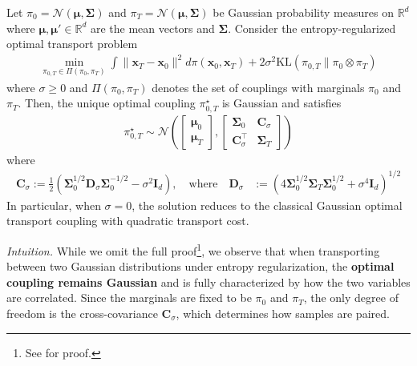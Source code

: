 \documentclass{article}
\begin{document}
\begin{lemma}\label{lemma:static-entropy-gaussian-ot}
Let $\pi_0 =\mathcal{N}(\boldsymbol{\mu}, \boldsymbol{\Sigma})$ and $\pi_T = \mathcal{N}(\boldsymbol{\mu}, \boldsymbol{\Sigma})$ be Gaussian probability measures on $\mathbb{R}^d$ where $\boldsymbol{\mu}, \boldsymbol{\mu}'\in \mathbb{R}^d$ are the mean vectors and $\boldsymbol{\Sigma}$. Consider the entropy-regularized optimal transport problem
\begin{align}
    \min_{\pi_{0,T} \in \Pi(\pi_0, \pi_T)}\int \|\boldsymbol{x}_T - \boldsymbol{x}_0\|^2  d\pi(\boldsymbol{x}_0, \boldsymbol{x}_T)+2\sigma^2 \text{KL}\left(\pi_{0,T} \| \pi_0 \otimes \pi_T\right)
\end{align}
where $\sigma \ge 0$ and $\Pi(\pi_0, \pi_T)$ denotes the set of couplings with marginals $\pi_0$ and $\pi_T$. Then, the unique optimal coupling $\pi^\star_{0,T}$ is Gaussian and satisfies
\begin{align}
    \pi^\star_{0,T} \sim \mathcal{N}\!\left(
\begin{bmatrix}
\boldsymbol{\mu}_0 \\
\boldsymbol{\mu}_T
\end{bmatrix}, \begin{bmatrix}
\boldsymbol{\Sigma}_0 & \boldsymbol{C}_\sigma \\
\boldsymbol{C}_\sigma^\top & \boldsymbol{\Sigma}_T\end{bmatrix}
\right)
\end{align}
where 
\begin{align}
\boldsymbol{C}_\sigma := \frac{1}{2}\left( \boldsymbol{\Sigma}_0^{1/2} \boldsymbol{D}_\sigma \boldsymbol{\Sigma}_0^{-1/2} - \sigma^2 \boldsymbol{I}_d \right),\quad \text{where}\quad \boldsymbol{D}_\sigma &:= \left(4 \boldsymbol{\Sigma}_0^{1/2} \boldsymbol{\Sigma}_T \boldsymbol{\Sigma}_0^{1/2} + \sigma^4 \boldsymbol{I}_d \right)^{1/2}
\end{align}
In particular, when $\sigma = 0$, the solution reduces to the classical Gaussian optimal transport coupling with quadratic transport cost.
\end{lemma}

\textit{Intuition.} While we omit the full proof\footnote{See \citet{janati2020entropic} for proof.}, we observe that when transporting between two Gaussian distributions under entropy regularization, the \textbf{optimal coupling remains Gaussian} and is fully characterized by how the two variables are correlated. Since the marginals are fixed to be $\pi_0$ and $\pi_T$, the only degree of freedom is the cross-covariance $\boldsymbol{C}_\sigma$, which determines how samples are paired. 
\end{document}

